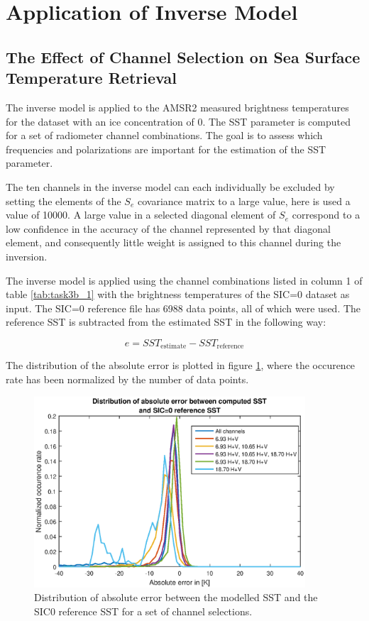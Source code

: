 \documentclass[11pt, a4paper]{article}
\begin{document}
\section{Application of Inverse Model}
\subsection{The Effect of Channel Selection on Sea Surface Temperature Retrieval}
The inverse model is applied to the AMSR2 measured brightness temperatures for the dataset with an ice concentration of 0. The SST parameter is computed for a set of radiometer channel combinations. The goal is to assess which frequencies and polarizations are important for the estimation of the SST parameter.
\newline

The ten channels in the inverse model can each individually be excluded by setting the elements of the \(S_e\) covariance matrix to a large value, here is used a value of 10000. A large value in a selected diagonal element of \(S_e\) correspond to a low confidence in the accuracy of the channel represented by that diagonal element, and consequently little weight is assigned to this channel during the inversion. 
\newline

The inverse model is applied using the channel combinations listed in column 1 of table \ref{tab:task3b_1} with the brightness temperatures of the SIC=0 dataset as input. The SIC=0 reference file has 6988 data points, all of which were used. The reference SST is subtracted from the estimated SST in the following way:

\begin{equation*}
e = SST_\text{estimate} - SST_\text{reference}
\end{equation*} 

The distribution of the absolute error is plotted in figure \ref{fig:task3b}, where the occurence rate has been normalized by the number of data points.   

\begin{figure}[h]
	\centering
	\includegraphics[width=0.9\textwidth]{task3b.eps}
	\caption{Distribution of absolute error between the modelled SST and the SIC0 reference SST for a set of channel selections.}
	\label{fig:task3b}
\end{figure}
\end{document}
